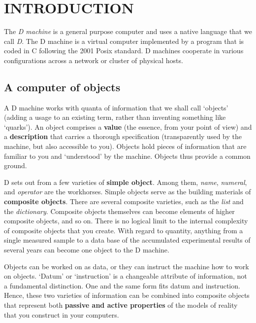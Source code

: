 
\chapter{INTRODUCTION}\label{chap:intro}

The \emph{D machine} is a general purpose computer and uses a native language that we call \emph{D}. The D machine is a virtual computer implemented by a program that is coded in C following the 2001 Posix standard. D machines cooperate in various configurations across a network or cluster of physical hosts.


\section{A computer of objects}

A D machine works with quanta of information that we  shall  call `objects'  (adding  a usage to an existing term,  rather  than  inventing something like `quarks').  An object comprises a \textbf{value} (the essence, from your   point  of  view)  and  a  \textbf{description}  that  carries  a   thorough specification (transparently used by the machine,  but also accessible to you).  Objects hold pieces of information that are familiar to you and `understood' by the machine. Objects thus provide  a common ground.

D  sets out from a few varieties of \textbf{simple  object}.  Among  them,  \emph{name}, \emph{numeral},  and \emph{operator} are the workhorses.  Simple objects serve as  the building  materials  of \textbf{composite objects}.  There  are  several  composite varieties,  such as the \emph{list} and  the  \emph{dictionary}. Composite objects themselves can become elements of higher composite objects, and so on.  There  is no logical limit to the internal complexity  of  composite objects that you create.  With regard to quantity, anything from a single measured sample to a data base of the accumulated experimental results of several years can become one object to the D machine.

Objects can be worked on as data, or they can instruct the machine how to work on objects. `Datum' or `instruction' is a changeable attribute of information,  not a fundamental  distinction. One  and the same form fits datum  and  instruction. Hence, these  two varieties of information can be combined into composite objects that represent  both \textbf{passive and active properties} of the models of reality that you construct in your computers.

